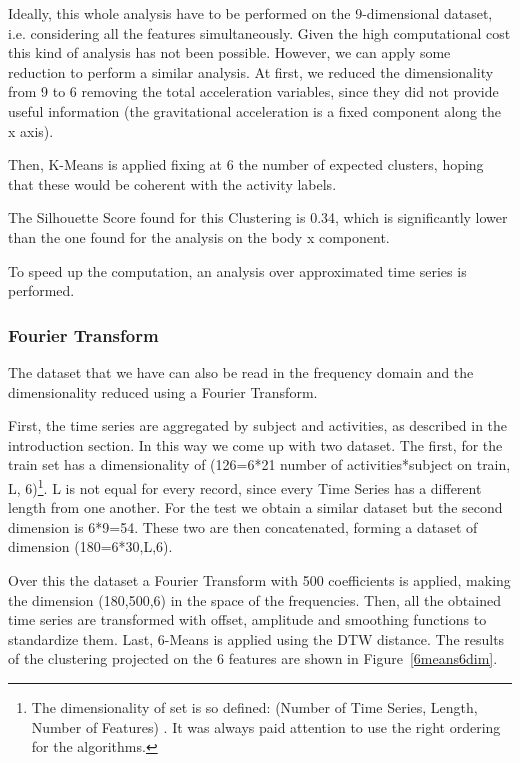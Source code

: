 \documentclass[10pt, a4paper, twocolumn]{article}
\begin{document}
Ideally, this whole analysis have to be performed on the 9-dimensional dataset, i.e. considering all the features simultaneously. Given the high computational cost this kind of analysis has not been possible. However, we can apply some reduction to perform a similar analysis.
At first, we reduced the dimensionality from 9 to 6 removing the total acceleration variables, since they did not provide useful information (the gravitational acceleration is a fixed component along the x axis).

Then, K-Means is applied fixing at 6 the number of expected clusters, hoping that these would be coherent with the activity labels. 

The Silhouette Score found for this Clustering is 0.34, which is significantly lower than the one found for the analysis on the body x component.  

To speed up the computation, an analysis over approximated time series is performed. 

\subsubsection{Fourier Transform}\label{fourier}

The dataset that we have can also be read in the frequency domain and the dimensionality reduced using a Fourier Transform. 

First, the time series are aggregated by subject and activities, as described in the introduction section. In this way we come up with two dataset. The first, for the train set has a dimensionality of (126=6*21 number of activities*subject on train, L, 6)\footnote{The dimensionality of set is so defined: (Number of Time Series, Length, Number of Features) . It was always paid attention to use the right ordering for the algorithms.}. L is not equal for every record, since every Time Series has a different length from one another. For the test we obtain a similar dataset but the second dimension is 6*9=54. These two are then concatenated, forming a dataset of dimension (180=6*30,L,6). 

Over this the dataset a Fourier Transform with 500 coefficients is applied, making the dimension (180,500,6) in the space of the frequencies. Then, all the obtained time series are transformed with offset, amplitude and smoothing functions to standardize them. Last, 6-Means is applied using the DTW distance. The results of the clustering projected on the 6 features are shown in Figure~\ref{6means6dim}.
\end{document}
